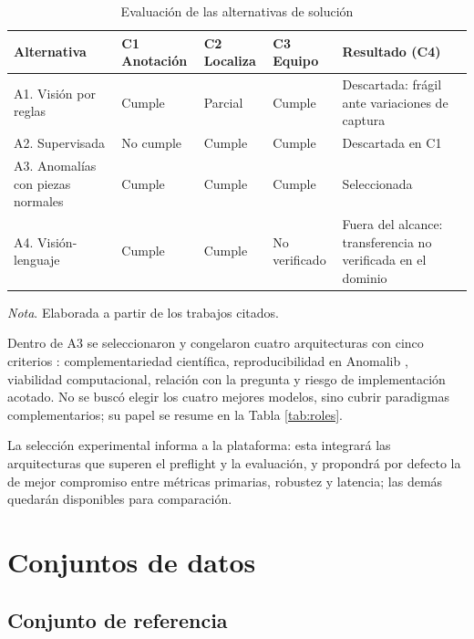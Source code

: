 \documentclass[12pt,oneside]{report}
\newcommand{\nota}[1]{\par\noindent\textit{Nota}. #1\par}
\begin{document}
\begin{table}[H]
\singlespacing\setlength{\parindent}{0pt}\setlength{\RaggedRightParindent}{0pt}
\caption{Evaluación de las alternativas de solución}
\label{tab:alternativas}
\begin{tabularx}{\textwidth}{@{}>{\RaggedRight\arraybackslash}p{3.4cm}>{\RaggedRight\arraybackslash}p{2.1cm}>{\RaggedRight\arraybackslash}p{1.6cm}>{\RaggedRight\arraybackslash}p{1.6cm}>{\RaggedRight\arraybackslash}X@{}}
\toprule
Alternativa & C1 Anotación & C2 Localiza & C3 Equipo & Resultado (C4) \\
\midrule
A1. Visión por reglas \cite{czimmermann2020} & Cumple & Parcial & Cumple & Descartada: frágil ante variaciones de captura \\
A2. Supervisada \cite{redmon2016} & No cumple & Cumple & Cumple & Descartada en C1 \\
A3. Anomalías con piezas normales \cite{roth2022,zavrtanik2021,batzner2024,guo2025} & Cumple & Cumple & Cumple & Seleccionada \\
A4. Visión-lenguaje \cite{jeong2023,zhou2024} & Cumple & Cumple & No verificado & Fuera del alcance: transferencia no verificada en el dominio \\
\bottomrule
\end{tabularx}
\nota{Elaborada a partir de los trabajos citados.}
\end{table}

Dentro de A3 se seleccionaron y congelaron cuatro arquitecturas con cinco criterios \cite{paez2026}: complementariedad científica, reproducibilidad en Anomalib \cite{akcay2022}, viabilidad computacional, relación con la pregunta y riesgo de implementación acotado. No se buscó elegir los cuatro mejores modelos, sino cubrir paradigmas complementarios; su papel se resume en la Tabla \ref{tab:roles}.

La selección experimental informa a la plataforma: esta integrará las arquitecturas que superen el preflight y la evaluación, y propondrá por defecto la de mejor compromiso entre métricas primarias, robustez y latencia; las demás quedarán disponibles para comparación.

\section{Conjuntos de datos}

\subsection{Conjunto de referencia}
\end{document}
